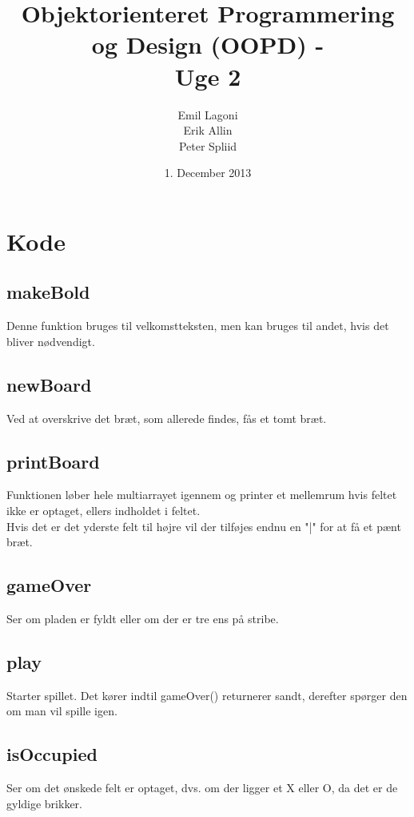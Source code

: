 \documentclass[a4paper,12pt]{article}
\title{Objektorienteret Programmering og Design (OOPD) - \\ Uge 2}
\author{Emil Lagoni \\ Erik Allin \\ Peter Spliid}
\date{1. December 2013}
\begin{document}
\maketitle %
\thispagestyle{empty}
\setcounter{page}{0}
\newpage


\section*{Kode}
\subsection*{makeBold}
Denne funktion bruges til velkomstteksten, men kan bruges til andet, hvis det
bliver nødvendigt.


\subsection*{newBoard}
Ved at overskrive det bræt, som allerede findes, fås et tomt bræt.


\subsection*{printBoard}
Funktionen løber hele multiarrayet igennem og printer et mellemrum hvis feltet
ikke er optaget, ellers indholdet i feltet.\\
Hvis det er det yderste felt til højre vil der tilføjes endnu en "|" for at få
et pænt bræt.


\subsection*{gameOver}
Ser om pladen er fyldt eller om der er tre ens på stribe.




\subsection*{play}
Starter spillet. Det kører indtil gameOver() returnerer sandt, derefter spørger
den om man vil spille igen.

\subsection*{isOccupied}
Ser om det ønskede felt er optaget, dvs. om der ligger et X eller O, da det er de gyldige brikker.
\end{document}

